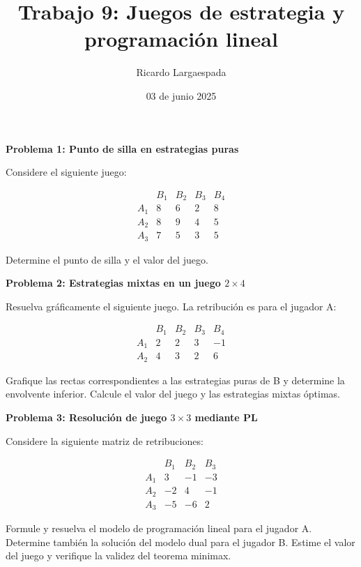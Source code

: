 \documentclass{article}
\title{Trabajo 9: Juegos de estrategia y programación lineal}
\author{Ricardo Largaespada}
\date{03 de junio 2025}
\begin{document}
\maketitle

\vspace{-.7cm}

\begin{problem} \textbf{Problema 1: Punto de silla en estrategias puras}

Considere el siguiente juego:

$$
\begin{array}{c|cccc}
      & B_1 & B_2 & B_3 & B_4 \\
\hline
A_1 & 8 & 6 & 2 & 8 \\
A_2 & 8 & 9 & 4 & 5 \\
A_3 & 7 & 5 & 3 & 5
\end{array}
$$

Determine el punto de silla y el valor del juego.

\end{problem}

\begin{problem}
\textbf{Problema 2: Estrategias mixtas en un juego $2\times 4$}

Resuelva gráficamente el siguiente juego. La retribución es para el jugador A:

$$
\begin{array}{c|cccc}
      & B_1 & B_2 & B_3 & B_4 \\
\hline
A_1 & 2 & 2 & 3 & -1 \\
A_2 & 4 & 3 & 2 & 6
\end{array}
$$

Grafique las rectas correspondientes a las estrategias puras de B y determine la envolvente inferior. Calcule el valor del juego y las estrategias mixtas óptimas.

\end{problem}

\begin{problem}
\textbf{Problema 3: Resolución de juego $3\times3$ mediante PL}

Considere la siguiente matriz de retribuciones:

$$
\begin{array}{c|ccc}
      & B_1 & B_2 & B_3 \\
\hline
A_1 & 3 & -1 & -3 \\
A_2 & -2 & 4 & -1 \\
A_3 & -5 & -6 & 2
\end{array}
$$

Formule y resuelva el modelo de programación lineal para el jugador A. Determine también la solución del modelo dual para el jugador B. Estime el valor del juego y verifique la validez del teorema minimax.

\end{problem}
\end{document}

